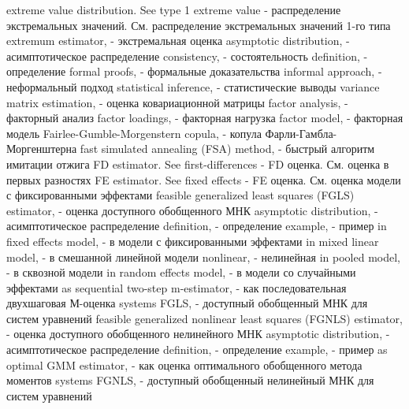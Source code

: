 extreme value distribution. See type 1 extreme value - распределение экстремальных значений. См. распределение экстремальных значений 1-го типа
extremum estimator, - экстремальная оценка
asymptotic distribution, - асимптотическое распределение
consistency, - состоятельность
definition, - определение
formal proofs, - формальные доказательства
informal approach, - неформальный подход
statistical inference, - статистические выводы
variance matrix estimation, - оценка ковариационной матрицы
factor analysis, - факторный анализ
factor loadings, - факторная нагрузка
factor model, - факторная модель
Fairlee-Gumble-Morgenstern copula, - копула Фарли-Гамбла-Моргенштерна
fast simulated annealing (FSA) method, - быстрый алгоритм имитации отжига
FD estimator. See first-differences - FD оценка. См. оценка в первых разностях
FE estimator. See fixed effects - FE оценка. См. оценка модели с фиксированными эффектами
feasible generalized least squares (FGLS) estimator, - оценка доступного обобщенного МНК
asymptotic distribution, - асимптотическое распределение
definition, - определение
example, - пример
in fixed effects model, - в модели с фиксированными эффектами
in mixed linear model, - в смешанной линейной модели
nonlinear, - нелинейная
in pooled model, - в сквозной модели
in random effects model, - в модели со случайными эффектами
as sequential two-step m-estimator, - как последовательная двухшаговая М-оценка
systems FGLS, - доступный обобщенный МНК для систем уравнений
feasible generalized nonlinear least squares (FGNLS) estimator, - оценка доступного обобщенного нелинейного МНК
asymptotic distribution, - асимптотическое распределение
definition, - определение
example, - пример
as optimal GMM estimator, - как оценка оптимального обобщенного метода моментов
systems FGNLS, - доступный обобщенный нелинейный МНК для систем уравнений

